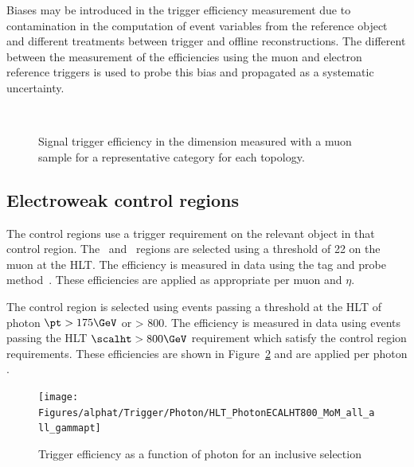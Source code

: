 Biases may be introduced in the trigger efficiency measurement due to contamination in the computation
of event variables from the reference object and different treatments between trigger and offline reconstructions.
The different between the measurement of the efficiencies using the muon and electron reference 
triggers is used to probe this bias and propagated as a systematic uncertainty. 

\begin{figure}[h!]
  \begin{center}
    ~~
     \\
    \caption{Signal trigger efficiency in the \mht dimension measured with a muon sample for a representative category for each topology.}
    \label{fig:alphat_turnons}
  \end{center}
\end{figure}

\subsection{Electroweak control regions}

The control regions use a trigger requirement on the relevant object in that control region.
The \mj~and \mmj~regions are selected using a threshold of 22 \GeV on the muon \pt at the HLT.
The efficiency is measured in data using the tag and probe method~\cite{MuonReco}. These efficiencies are 
applied as appropriate per muon \pt and $\eta$. 

The \gj control region is selected using events passing a threshold at the HLT of photon $\pt > 175 \GeV$ 
or \scalht > 800\GeV. The efficiency is measured in data using events passing the HLT $\scalht > 800\GeV$ 
requirement which satisfy the \gj control region requirements. These efficiencies are shown in
Figure~\ref{fig:photon_turnons_photonPt} and are applied per photon \pt.

\begin{figure}[h!]
  \begin{center}
    \texttt{[image: Figures/alphat/Trigger/Photon/HLT\_PhotonECALHT800\_MoM\_all\_all\_gammapt]}
    \caption{Trigger efficiency as a function of photon \pt for an inclusive selection}
    \label{fig:photon_turnons_photonPt}
  \end{center}
\end{figure}
